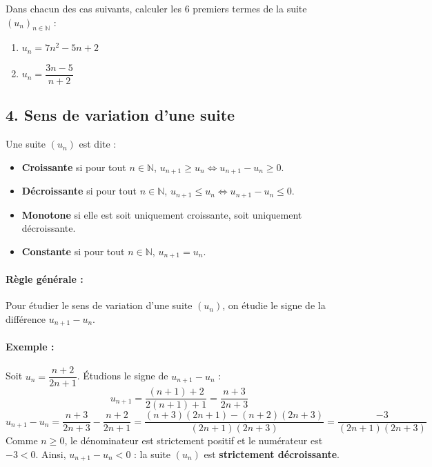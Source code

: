 \documentclass[12pt,a4paper]{article}
\begin{document}
\begin{tcolorbox}[colback=yellow!5!white,colframe=myred,title=\textbf{Exercice d'application}]
Dans chacun des cas suivants, calculer les $6$ premiers termes de la suite $(u_n)_{n \in \mathbb{N}}$ :
\begin{enumerate}
    \item $u_n = 7n^2 - 5n + 2$
    \item $u_n = \dfrac{3n - 5}{n + 2}$
\end{enumerate}
\end{tcolorbox}

\subsection*{\color{myred}4. Sens de variation d'une suite}

\begin{tcolorbox}[colback=blue!5!white,colframe=myblue,title=\textbf{Définitions}]
Une suite $(u_n)$ est dite :
\begin{itemize}
    \item \textbf{Croissante} si pour tout $n \in \mathbb{N}$, $u_{n+1} \ge u_n \iff u_{n+1} - u_n \ge 0$.
    \item \textbf{Décroissante} si pour tout $n \in \mathbb{N}$, $u_{n+1} \le u_n \iff u_{n+1} - u_n \le 0$.
    \item \textbf{Monotone} si elle est soit uniquement croissante, soit uniquement décroissante.
    \item \textbf{Constante} si pour tout $n \in \mathbb{N}$, $u_{n+1} = u_n$.
\end{itemize}
\end{tcolorbox}

\paragraph{Règle générale :} Pour étudier le sens de variation d'une suite $(u_n)$, on étudie le signe de la différence $u_{n+1} - u_n$.

\paragraph{Exemple :}
Soit $u_n = \dfrac{n+2}{2n+1}$. Étudions le signe de $u_{n+1} - u_n$ :
\[
u_{n+1} = \dfrac{(n+1)+2}{2(n+1)+1} = \dfrac{n+3}{2n+3}
\]
\[
u_{n+1} - u_n = \dfrac{n+3}{2n+3} - \dfrac{n+2}{2n+1} = \dfrac{(n+3)(2n+1) - (n+2)(2n+3)}{(2n+1)(2n+3)} = \dfrac{-3}{(2n+1)(2n+3)}
\]
Comme $n \ge 0$, le dénominateur est strictement positif et le numérateur est $-3 < 0$. 
Ainsi, $u_{n+1} - u_n < 0$ : la suite $(u_n)$ est \textbf{strictement décroissante}.
\end{document}
